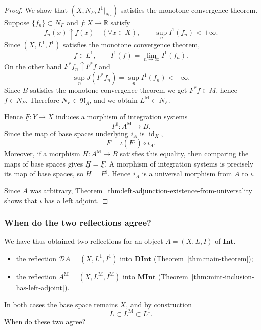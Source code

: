 \begin{proof}
  We show that $(X,N_F,I^1|_{N_F})$ satisfies the monotone convergence theorem.
  Suppose $\{f_n\}\subset N_F$ and $f:X\to\mathbb{R}$ satisfy
  \[
    f_n(x)\uparrow f(x)\quad(\forall x\in X),
    \qquad
    \sup_n I^1(f_n)<+\infty .
  \]
  Since $(X,L^1,I^1)$ satisfies the monotone convergence theorem,
  \[
    f\in L^1,
    \qquad
    I^1(f)=\lim_{n\to\infty}I^1(f_n).
  \]
  On the other hand $F^*f_n\uparrow F^*f$ and
  \[
    \sup_nJ(F^*f_n)=\sup_nI^1(f_n)<+\infty.
  \]
  Since $B$ satisfies the monotone convergence theorem we get $F^*f\in M$, hence
  $f\in N_F$. Therefore $N_F\in\mathfrak{N}_A$, and we obtain
  $L^{\mathrm{M}}\subset N_F$.

  Hence $\underline{F}:Y\to X$ induces a morphism of integration systems
  \[
    F^\sharp:A^{\mathrm{M}}\to B .
  \]
  Since the map of base spaces underlying $i_A$ is $\operatorname{id}_X$,
  \[
    F=\iota(F^\sharp)\circ i_A.
  \]
  Moreover, if a morphism $H:A^{\mathrm{M}}\to B$ satisfies this equality, then
  comparing the maps of base spaces gives $\underline{H}=\underline{F}$. A
  morphism of integration systems is precisely its map of base spaces, so
  $H=F^\sharp$. Hence $i_A$ is a universal morphism from $A$ to $\iota$.

  Since $A$ was arbitrary,
  Theorem~\ref{thm:left-adjunction-existence-from-universality} shows that
  $\iota$ has a left adjoint.
\end{proof}

\subsubsection{When do the two reflections agree?}

We have thus obtained two reflections for an object $A=(X,L,I)$ of
$\mathbf{Int}$.
\begin{itemize}
  \item the reflection $\mathcal{D}A=(X,L^1,I^1)$ into $\mathbf{DInt}$
    (Theorem~\ref{thm:main-theorem});
  \item the reflection $A^{\mathrm{M}}=(X,L^{\mathrm{M}},I^{\mathrm{M}})$ into
    $\mathbf{MInt}$ (Theorem~\ref{thm:mint-inclusion-has-left-adjoint}).
\end{itemize}
In both cases the base space remains $X$, and by construction
\[
  L\subset L^{\mathrm{M}}\subset L^1 .
\]
When do these two agree?

